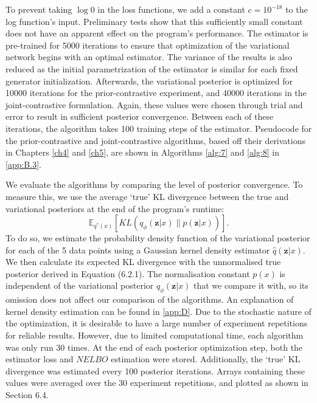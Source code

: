 \documentclass[honours,12pt, twoside]{unswthesis}
\newcommand{\E}{\mathbb{E}}
\numberwithin{equation}{section}
\theoremstyle{definition}
\begin{document}
To prevent taking $\log 0$ in the loss functions, we add a constant $c=10^{-18}$ to the log function's input. Preliminary tests show that this sufficiently small constant does not have an apparent effect on the program's performance. The estimator is pre-trained for 5000 iterations to ensure that optimization of the variational network begins with an optimal estimator. The variance of the results is also reduced as the initial parametrization of the estimator is similar for each fixed generator initialization. Afterwards, the variational posterior is optimized for 10000 iterations for the prior-contrastive experiment, and 40000 iterations in the joint-contrastive formulation. Again, these values were chosen through trial and error to result in sufficient posterior convergence. Between each of these iterations, the algorithm takes 100 training steps of the estimator. Pseudocode for the prior-contrastive and joint-contrastive algorithms, based off their derivations in Chapters \ref{ch4} and \ref{ch5}, are shown in Algorithms \ref{alg:7} and \ref{alg:8} in \autoref{app:B.3}.

We evaluate the algorithms by comparing the level of posterior convergence. To measure this, we use the average `true' KL divergence between the true and variational posteriors at the end of the program's runtime: \[\E_{q^*(x)}\left[KL(q_\phi(\bm{z}|x)\|p(\bm{z}|x))\right].\] To do so, we estimate the probability density function of the variational posterior for each of the 5 data points using a Gaussian kernel density estimator $\hat{q}(\bm{z}|x)$. We then calculate its expected KL divergence with the unnormalised true posterior derived in Equation (6.2.1). The normalisation constant $p(x)$ is independent of the variational posterior $q_\phi(\bm{z}|x)$ that we compare it with, so its omission does not affect our comparison of the algorithms. An explanation of kernel density estimation can be found in \autoref{app:D}. Due to the stochastic nature of the optimization, it is desirable to have a large number of experiment repetitions for reliable results. However, due to limited computational time, each algorithm was only run 30 times. At the end of each posterior optimization step, both the estimator loss and $NELBO$ estimation were stored. Additionally, the `true' KL divergence was estimated every 100 posterior iterations. Arrays containing these values were averaged over the 30 experiment repetitions, and plotted as shown in Section 6.4.
\end{document}
